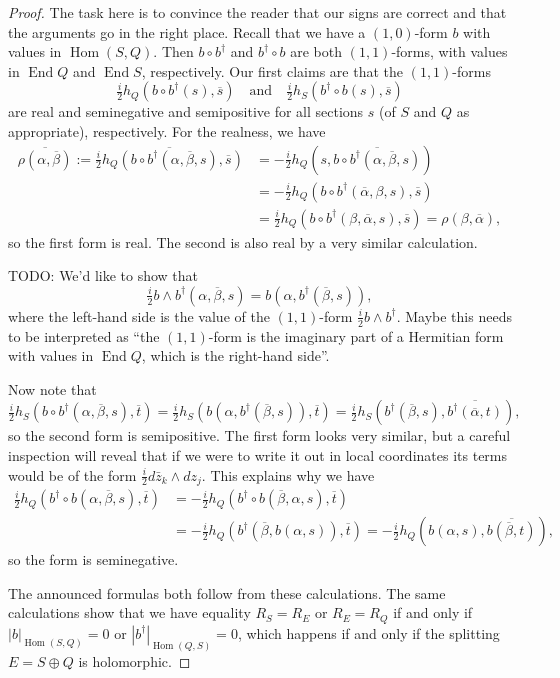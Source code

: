 \documentclass[10pt,a4paper]{article}
\newtheorem*{proof}{Proof}
\def\qandq{\quad\text{and}\quad}
\def\ov#1{\overline{#1}}
\DeclareMathOperator{\End}{End}
\DeclareMathOperator{\Hom}{Hom}
\begin{document}
\begin{proof}
The task here is to convince the reader that our signs are correct and that the arguments go in the right place. Recall that we have a $(1,0)$-form $b$ with values in $\Hom(S,Q)$. Then $b \circ b^\dagger$ and $b^\dagger \circ b$ are both $(1,1)$-forms, with values in $\End Q$ and $\End S$, respectively. Our first claims are that the $(1,1)$-forms
\[
\tfrac i2 h_Q(b \circ b^\dagger(s), \ov s)
\qandq
\tfrac i2 h_S(b^\dagger \circ b(s), \ov s)
\]
are real and seminegative and semipositive for all sections $s$ (of $S$ and $Q$ as appropriate), respectively. For the realness, we have
\begin{align*}
\overline{\rho(\alpha, \ov\beta)}
:= \overline{\tfrac i2 h_Q(b \circ b^\dagger(\alpha, \ov\beta, s), \ov s)}
&= -\tfrac i2 h_Q(s, \ov{b \circ b^\dagger(\alpha,\ov\beta, s)})
\\
&= -\tfrac i2 h_Q(b \circ b^\dagger(\ov\alpha, \beta, s), \ov{s})
\\
&= \tfrac i2 h_Q(b \circ b^\dagger(\beta, \ov\alpha, s), \ov{s})
= \rho(\beta, \ov\alpha),
\end{align*}
so the first form is real. The second is also real by a very similar calculation.

TODO: We'd like to show that
\[
\tfrac i2 b \wedge b^\dagger (\alpha, \ov\beta, s)
= b(\alpha, b^\dagger(\ov\beta, s)),
\]
where the left-hand side is the value of the $(1,1)$-form $\frac i2 b \wedge b^\dagger$. Maybe this needs to be interpreted as ``the $(1,1)$-form is the imaginary part of a Hermitian form with values in $\End Q$, which is the right-hand side''.

Now note that
\[
\tfrac i2 h_S(b \circ b^\dagger(\alpha, \ov\beta, s), \ov t)
= \tfrac i2 h_S(b(\alpha, b^\dagger(\ov \beta, s)), \ov t)
= \tfrac i2 h_S(b^\dagger(\ov \beta, s), \ov{b^\dagger(\ov \alpha, t)}),
\]
so the second form is semipositive. The first form looks very similar, but a careful inspection will reveal that if we were to write it out in local coordinates its terms would be of the form $\frac i2 d\bar z_k \wedge dz_j$. This explains why we have
\begin{align*}
\tfrac i2 h_Q(b^\dagger \circ b(\alpha, \ov\beta, s), \ov t)
&= -\tfrac i2 h_Q(b^\dagger \circ b(\ov\beta, \alpha, s), \ov t)
\\
&= -\tfrac i2 h_Q(b^\dagger(\ov\beta, b(\alpha, s)), \ov t)
= -\tfrac i2 h_Q(b(\alpha, s), \ov{b(\ov\beta, t)}),
\end{align*}
so the form is seminegative.

The announced formulas both follow from these calculations. The same calculations show that we have equality $R_S = R_E$ or $R_E = R_Q$ if and only if $|b|_{\Hom(S,Q)} = 0$ or $|b^\dagger|_{\Hom(Q,S)} = 0$, which happens if and only if the splitting $E = S \oplus Q$ is holomorphic.
\end{proof}
\end{document}

